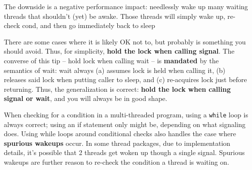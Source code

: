 The downside is a negative performance impact: needlessly wake up many waiting threads that shouldn't (yet) be awake. Those threads will simply wake up, re-check cond, and then go immediately back to sleep
\begin{tcolorbox}[left=0mm, top=1mm, right=0mm, rightlower=0mm, bottom=1mm,
  title=Always hold the lock while signaling,halign title=center]
There are some cases where it is likely OK not to, but probably is something you should avoid. Thus, for simplicity, \textbf{hold the lock when calling signal}. The converse of this tip -- hold lock when calling wait -- is \textbf{mandated} by the semantics of wait: wait always
(a) assumes lock is held when calling it, (b) releases said lock when
putting caller to sleep, and (c) re-acquires lock just before returning. Thus, the generalization is correct:\textbf{ hold the lock when calling signal or wait}, and you will always be in good shape.
\end{tcolorbox}
\begin{tcolorbox}[left=0mm, top=1mm, right=0mm, rightlower=0mm, bottom=1mm,
  title=Use \texttt{while} (not \texttt{if}) for conditions,
  halign title=center]
When checking for a condition in a multi-threaded program, using a
\texttt{while} loop is always correct; using an if statement only might be, depending on what signaling does. Using while loops around conditional checks also handles the case where \textbf{spurious wakeups} occur. In some thread packages, due to implementation details, it's possible that 2 threads get woken up though a single signal. Spurious wakeups are further reason to re-check the condition a thread is waiting on.
\end{tcolorbox}
